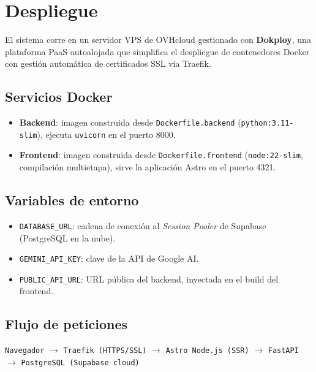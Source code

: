 \documentclass[12pt,a4paper]{article}
\begin{document}
\section{Despliegue}

El sistema corre en un servidor VPS de OVHcloud gestionado con \textbf{Dokploy}, una plataforma PaaS autoalojada que simplifica el despliegue de contenedores Docker con gestión automática de certificados SSL vía Traefik.

\subsection*{Servicios Docker}

\begin{itemize}[nosep]
  \item \textbf{Backend}: imagen construida desde \texttt{Dockerfile.backend} (\texttt{python:3.11-slim}), ejecuta \texttt{uvicorn} en el puerto 8000.
  \item \textbf{Frontend}: imagen construida desde \texttt{Dockerfile.frontend} (\texttt{node:22-slim}, compilación multietapa), sirve la aplicación Astro en el puerto 4321.
\end{itemize}

\subsection*{Variables de entorno}

\begin{itemize}[nosep]
  \item \texttt{DATABASE\_URL}: cadena de conexión al \textit{Session Pooler} de Supabase (PostgreSQL en la nube).
  \item \texttt{GEMINI\_API\_KEY}: clave de la API de Google AI.
  \item \texttt{PUBLIC\_API\_URL}: URL pública del backend, inyectada en el build del frontend.
\end{itemize}

\subsection*{Flujo de peticiones}

\begin{center}
\texttt{Navegador} $\rightarrow$ \texttt{Traefik (HTTPS/SSL)} $\rightarrow$ \texttt{Astro Node.js (SSR)} $\rightarrow$ \texttt{FastAPI} $\rightarrow$ \texttt{PostgreSQL (Supabase cloud)}
\end{center}
\end{document}

